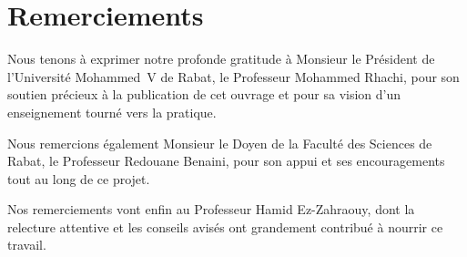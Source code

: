 \chapter*{Remerciements}

Nous tenons à exprimer notre profonde gratitude à Monsieur le Président de l'Université
Mohammed~V de Rabat, le Professeur Mohammed Rhachi, pour son soutien précieux à la publication de
cet ouvrage et pour sa vision d'un enseignement tourné vers la pratique.

Nous remercions également Monsieur le Doyen de la Faculté des Sciences de Rabat, le Professeur
Redouane Benaini, pour son appui et ses encouragements tout au long de ce projet.

Nos remerciements vont enfin au Professeur Hamid Ez-Zahraouy, dont la relecture attentive et les
conseils avisés ont grandement contribué à nourrir ce travail.
